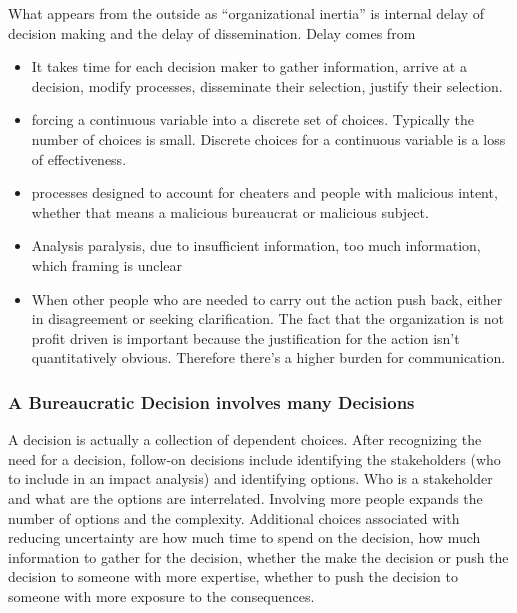 What appears from the outside as ``organizational inertia'' is internal delay of decision making and the delay of dissemination. 
Delay comes from
\begin{itemize}
    \item It takes time for each decision maker to gather information, arrive at a decision, modify processes, disseminate their selection, justify their selection. 
    \item forcing a continuous variable into a discrete set of choices. Typically the number of choices is small. Discrete choices for a continuous variable is a loss of effectiveness.
    \item processes designed to account for cheaters and people with malicious intent, whether that means a malicious bureaucrat or malicious subject. 
\item Analysis paralysis, due to {insufficient information, too much information, which framing is unclear}
\item When other people who are needed to carry out the action push back, either in disagreement or seeking clarification. The fact that the organization is not profit driven is important because the justification for the action isn't quantitatively obvious. Therefore there's a higher burden for communication.
\end{itemize}




\subsubsection{A Bureaucratic Decision involves many Decisions}

A decision is actually a collection of dependent choices. After recognizing the need for a decision, follow-on decisions include identifying the stakeholders (who to include in an impact analysis) and identifying options. Who is a stakeholder and what are the options are interrelated. Involving more people expands the number of options and the complexity. Additional choices associated with reducing uncertainty are how much time to spend on the decision, how much information to gather for the decision, whether the make the decision or push the decision to someone with more expertise, whether to push the decision to someone with more exposure to the consequences.


